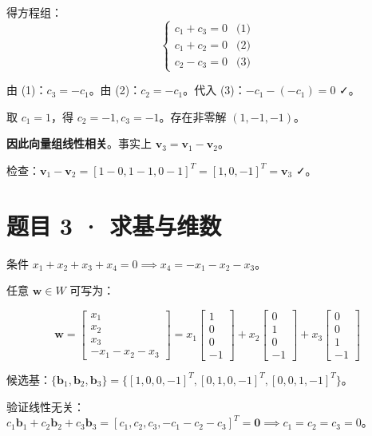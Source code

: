 \documentclass[12pt]{ctexart}
\begin{document}
得方程组：
\[
\begin{cases}
c_1 + c_3 = 0 & \text{(1)} \\
c_1 + c_2 = 0 & \text{(2)} \\
c_2 - c_3 = 0 & \text{(3)}
\end{cases}
\]

由 (1)：$c_3 = -c_1$。由 (2)：$c_2 = -c_1$。代入 (3)：$-c_1 - (-c_1) = 0$ ✓。

取 $c_1 = 1$，得 $c_2 = -1, c_3 = -1$。存在非零解 $(1, -1, -1)$。

\textbf{因此向量组线性相关}。事实上 $\mathbf{v}_3 = \mathbf{v}_1 - \mathbf{v}_2$。

检查：$\mathbf{v}_1 - \mathbf{v}_2 = [1-0, 1-1, 0-1]^T = [1, 0, -1]^T = \mathbf{v}_3$ ✓。

\section*{题目 3 · 求基与维数}

条件 $x_1 + x_2 + x_3 + x_4 = 0 \implies x_4 = -x_1 - x_2 - x_3$。

任意 $\mathbf{w} \in W$ 可写为：

\[
\mathbf{w} = \begin{bmatrix} x_1 \\ x_2 \\ x_3 \\ -x_1-x_2-x_3 \end{bmatrix}
= x_1\begin{bmatrix} 1 \\ 0 \\ 0 \\ -1 \end{bmatrix}
+ x_2\begin{bmatrix} 0 \\ 1 \\ 0 \\ -1 \end{bmatrix}
+ x_3\begin{bmatrix} 0 \\ 0 \\ 1 \\ -1 \end{bmatrix}
\]

候选基：$\{\mathbf{b}_1, \mathbf{b}_2, \mathbf{b}_3\} = \{[1,0,0,-1]^T, [0,1,0,-1]^T, [0,0,1,-1]^T\}$。

验证线性无关：$c_1\mathbf{b}_1 + c_2\mathbf{b}_2 + c_3\mathbf{b}_3 = [c_1, c_2, c_3, -c_1-c_2-c_3]^T = \mathbf{0} \implies c_1=c_2=c_3=0$。
\end{document}
